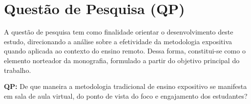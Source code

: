 \section{Questão de Pesquisa (QP)}\label{sec:research.question}

A questão de pesquisa tem como finalidade orientar o desenvolvimento deste estudo, direcionando a análise sobre a efetividade da metodologia expositiva quando aplicada ao contexto do ensino remoto. Dessa forma, constitui-se como o elemento norteador da monografia, formulado a partir do objetivo principal do trabalho.

\textbf{QP:} De que maneira a metodologia tradicional de ensino expositivo se manifesta em sala de aula virtual, do ponto de vista do foco e engajamento dos estudantes?
